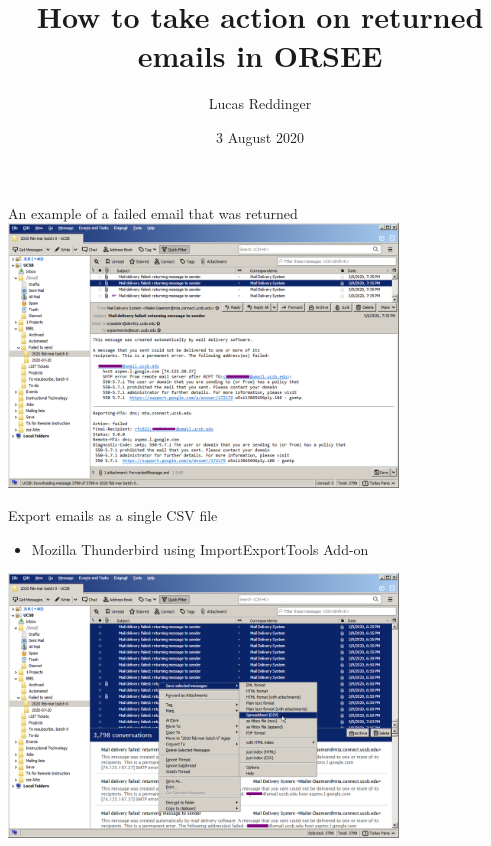 \documentclass[professionalfont,10pt]{beamer}
\title{How to take action on returned emails in ORSEE}
\author{Lucas Reddinger}
\institute{UCSB}
\date{3 August 2020}
\begin{document}
\frame{\titlepage}

\begin{frame}{An example of a failed email that was returned}
\vspace{0.25cm}
\includegraphics[height=7cm]{email-failed-example.png}
\end{frame}

\begin{frame}{Export emails as a single CSV file}
\begin{itemize}
\item Mozilla Thunderbird using ImportExportTools Add-on
\end{itemize}
\vspace{0.25cm}
\includegraphics[height=7cm]{email-export-as-csv.png}
\end{frame}
\end{document}
